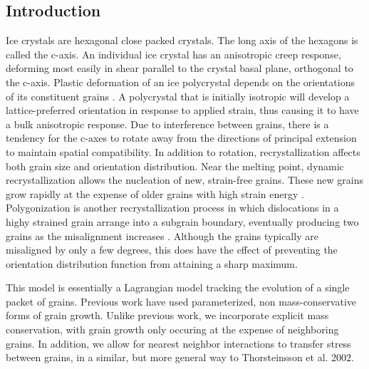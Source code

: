 \documentclass[a0,landscape]{a0poster}
\begin{document}
\begin{multicols}{3}
\section*{Introduction}
Ice crystals are hexagonal close packed crystals. The long axis of the hexagons is called the c-axis. An individual ice crystal has an anisotropic creep response, deforming most easily in shear parallel to the crystal basal plane, orthogonal to the c-axis. Plastic deformation of an ice polycrystal depends on the orientations of its constituent grains \citep{azuma94}. A polycrystal that is initially isotropic will develop a lattice-preferred orientation in response to applied strain, thus causing it to have a bulk anisotropic response. Due to interference between grains, there is a tendency for the c-axes to rotate away from the directions of principal extension to maintain spatial compatibility. In addition to rotation, recrystallization affects both grain size and orientation distribution. Near the melting point, dynamic recrystallization allows the nucleation of new, strain-free grains. These new grains grow rapidly at the expense of older grains with high strain energy \citep{duval1995}. Polygonization is another recrystallization process in which dislocations in a highy strained grain arrange into a subgrain boundary, eventually producing two grains as the misalignment increases \citep{alley97}. Although the grains typically are misaligned by only a few degrees, this does have the effect of preventing the orientation distribution function from attaining a sharp maximum.

This model is essentially a Lagrangian model tracking the evolution of a single packet of grains. Previous work have used parameterized, non mass-conservative forms of grain growth. Unlike previous work, we incorporate explicit mass conservation, with grain growth only occuring at the expense of neighboring grains. In addition, we allow for nearest neighbor interactions to transfer stress between grains, in a similar, but more general way to Thorsteinsson et al. 2002. 

\color{DarkSlateGray} %



\end{multicols}
\end{document}
